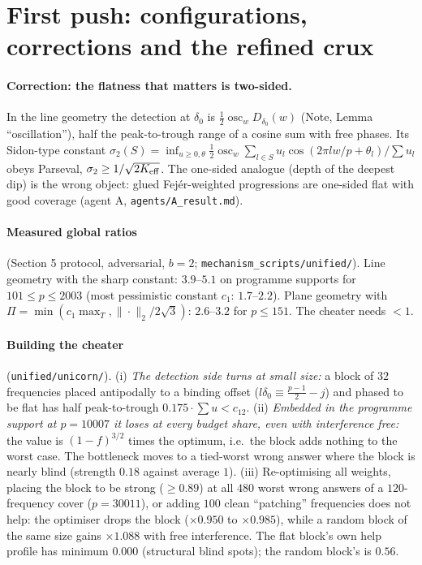\documentclass[11pt]{article}
\theoremstyle{definition}
\begin{document}
\section{First push: configurations, corrections and the refined crux}\label{sec:push}
\paragraph{Correction: the flatness that matters is two-sided.}  In the line geometry the detection at $\delta_0$ is
$\frac12\operatorname{osc}_wD_{\delta_0}(w)$ (Note, Lemma ``oscillation''), half the peak-to-trough range of a cosine sum with free phases.  Its Sidon-type constant
$\sigma_2(S)=\inf_{u\ge0,\theta}\frac12\operatorname{osc}_w\sum_{l\in S}u_l\cos(2\pi lw/p+\theta_l)/\sum u_l$ obeys Parseval, $\sigma_2\ge1/\sqrt{2K_{\rm eff}}$.  The one-sided analogue
(depth of the deepest dip) is the wrong object: glued Fej\'er-weighted progressions are one-sided flat with good coverage (agent A, \texttt{agents/A\_result.md}).

\paragraph{Measured global ratios} (Section 5 protocol, adversarial, $b=2$; \texttt{mechanism\_scripts/unified/}).  Line geometry with the sharp constant: $3.9$--$5.1$ on programme supports for
$101\le p\le2003$ (most pessimistic constant $c_1$: $1.7$--$2.2$).  Plane geometry with $\Pi=\min(c_1\max_T,\|\cdot\|_2/2\sqrt3)$: $2.6$--$3.2$ for $p\le151$.  The cheater needs $<1$.

\paragraph{Building the cheater} (\texttt{unified/unicorn/}).  (i) \emph{The detection side turns at small size:} a block of $32$ frequencies placed antipodally to a binding
offset ($l\delta_0\equiv\frac{p-1}2-j$) and phased to be flat has half peak-to-trough $0.175\cdot\sum u<c_{12}$.  (ii) \emph{Embedded in the programme support at $p=10007$ it loses at every
budget share, even with interference free:} the value is $(1-f)^{3/2}$ times the optimum, i.e.\ the block adds nothing to the worst case.  The bottleneck moves to a tied-worst wrong answer
where the block is nearly blind (strength $0.18$ against average $1$).  (iii) Re-optimising all weights, placing the block to be strong ($\ge0.89$) at all $480$ worst wrong answers of a
$120$-frequency cover ($p=30011$), or adding $100$ clean ``patching'' frequencies does not help: the optimiser drops the block ($\times0.950$ to $\times0.985$), while a random block of the same
size gains $\times1.088$ with free interference.  The flat block's own help profile has minimum $0.000$ (structural blind spots); the random block's is $0.56$.
\end{document}
